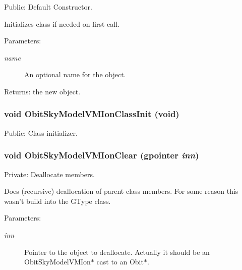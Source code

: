 Public: Default Constructor. 

Initializes class if needed on first call. \begin{Desc}
\item[Parameters:]
\begin{description}
\item[{\em name}]An optional name for the object. \end{description}
\end{Desc}
\begin{Desc}
\item[Returns:]the new object. \end{Desc}
\subsubsection{\setlength{\rightskip}{0pt plus 5cm}void Obit\-Sky\-Model\-VMIon\-Class\-Init (void)}\label{ObitSkyModelVMIon_8c_a17}


Public: Class initializer. 

\subsubsection{\setlength{\rightskip}{0pt plus 5cm}void Obit\-Sky\-Model\-VMIon\-Clear (gpointer {\em inn})}\label{ObitSkyModelVMIon_8c_a4}


Private: Deallocate members. 

Does (recursive) deallocation of parent class members. For some reason this wasn't build into the GType class. \begin{Desc}
\item[Parameters:]
\begin{description}
\item[{\em inn}]Pointer to the object to deallocate. Actually it should be an Obit\-Sky\-Model\-VMIon$\ast$ cast to an Obit$\ast$. \end{description}
\end{Desc}
